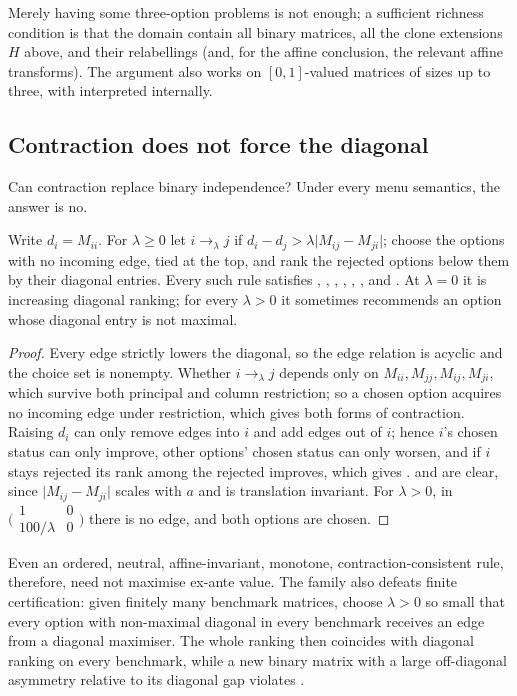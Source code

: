Merely having some three-option problems is not enough; a sufficient richness condition is that the
domain contain all binary matrices, all the clone extensions $H$ above, and their relabellings (and,
for the affine conclusion, the relevant affine transforms). The argument also works on
$[0,1]$-valued matrices of sizes up to three, with  interpreted internally.

\subsection{Contraction does not force the diagonal}

Can contraction replace binary independence? Under every menu semantics, the answer is no.

\begin{theorem}\label{thm:lambda}
Write $d_i=M_{ii}$. For $\lambda\ge0$ let $i\to_\lambda j$ if $d_i-d_j>\lambda\lvert M_{ij}-M_{ji}\rvert$; choose
the options with no incoming edge, tied at the top, and rank the rejected options below them by their
diagonal entries. Every such rule satisfies , , \Cpr, \Ccol, , , and \Mon. At
$\lambda=0$ it is increasing diagonal ranking; for every $\lambda>0$ it sometimes recommends an option
whose diagonal entry is not maximal.
\end{theorem}

\begin{proof}
Every edge strictly lowers the diagonal, so the edge relation is acyclic and the choice set is
nonempty. Whether $i\to_\lambda j$ depends only on $M_{ii},M_{jj},M_{ij},M_{ji}$, which survive both principal
and column restriction; so a chosen option acquires no incoming edge under restriction, which gives
both forms of contraction. Raising $d_i$ can only remove edges into $i$ and add edges out of $i$; hence
$i$'s chosen status can only improve, other options' chosen status can only worsen, and if $i$ stays
rejected its rank among the rejected improves, which gives \Mon.  and  are clear, since
$\lvert M_{ij}-M_{ji}\rvert$ scales with $a$ and is translation invariant. For $\lambda>0$, in
$\bigl(\begin{smallmatrix}1&0\\100/\lambda&0\end{smallmatrix}\bigr)$ there is no edge, and both options
are chosen.
\end{proof}

Even an ordered, neutral, affine-invariant, monotone, contraction-consistent rule, therefore, need not
maximise ex-ante value. The family also defeats finite certification: given finitely many benchmark
matrices, choose $\lambda>0$ so small that every option with non-maximal diagonal in every benchmark
receives an edge from a diagonal maximiser. The whole ranking then coincides with diagonal ranking on
every benchmark, while a new binary matrix with a large off-diagonal asymmetry relative to its
diagonal gap violates .


